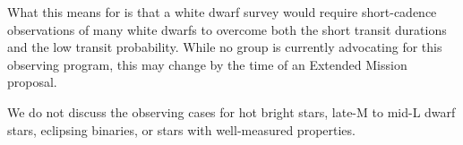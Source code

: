 \begin{enumerate}
	What this means for \tess is that a white dwarf survey would require short-cadence observations of many white dwarfs to overcome both the short transit durations and the low transit probability.
	While no group is currently advocating for this observing program, this may change by the time of an Extended Mission proposal.

\end{enumerate}

We do not discuss the observing cases for hot bright stars, late-M to mid-L dwarf stars, eclipsing binaries, or stars with well-measured properties.

\begin{comment}
\paragraph{Microlensing survey}
Read relevant K2C9 papers. this is likely a bad idea (you can't get a good microlensing parallax like you could for K2C9)
\end{comment}
